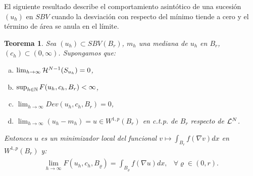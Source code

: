 \documentclass[a4paper,11pt,spanish, twoside, leqno]{tfm-uam}
\newtheorem{teo}{Teorema}[chapter]
\begin{document}
El siguiente resultado describe el comportamiento asintótico de una sucesión $(u_{h})$ en $SBV$ cuando la desviación con respecto del mínimo tiende a cero y el término de área se anula en el límite. 
\begin{teo}\label{teo:comportamiento asintótico 2 de una sucesión en SBV}
Sea $(u_{h})\subset SBV(B_{r})$, $m_{h}$ una mediana  de $u_{h}$ en $B_{r}$, $(c_{h})\subset (0,\infty)$. Supongamos que:
\begin{enumerate}[(a)]\label{teo:comportamiento asintótico 2 de una sucesión en SBV:hipetesis}
\item $\lim_{h\to\infty}\mathcal{H}^{N-1}(S_{u_{h}})=0$, \label{teo:comportamiento asintótico 2 de una sucesión en SBV:hipetesis:a}
\item $\sup_{h\in \mathbb{N}} F(u_{h},c_{h}, B_{r})<\infty$,\label{teo:comportamiento asintótico 2 de una sucesión en SBV:hipetesis:b}
\item $\lim_{h\to \infty}Dev(u_{h}, c_{h}, B_{r})=0$,\label{teo:comportamiento asintótico 2 de una sucesión en SBV:hipetesis:c}
\item $\lim_{h\to \infty}(u_{h}-m_{h})=u\in W^{1,p}(B_{r})$ en c.t.p. de $B_{r}$ respecto de $\mathcal{L}^{N}$.\label{teo:comportamiento asintótico 2 de una sucesión en SBV:hipetesis:d}
\end{enumerate}
Entonces $u$ es un minimizador local del funcional $v\mapsto \int_{B_{r}}f(\nabla{v})dx$ en $W^{1,p}(B_{r})$ y:
\begin{align*}
\begin{array}{ll}
\displaystyle
\lim_{h\to \infty} F(u_{h}, c_{h}, B_{\varrho})=\int_{B_{\varrho}}f(\nabla{u})dx,& \forall \varrho\in (0,r).
\end{array}
\end{align*}
\end{teo}
\end{document}
